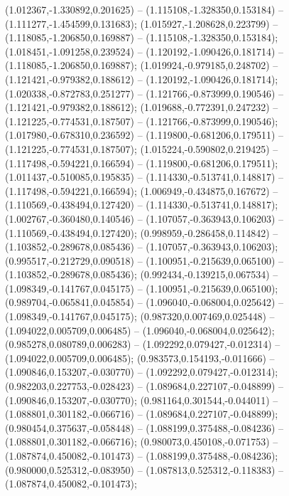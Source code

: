  (1.012367,-1.330892,0.201625) -- (1.115108,-1.328350,0.153184) -- (1.111277,-1.454599,0.131683);
 (1.015927,-1.208628,0.223799) -- (1.118085,-1.206850,0.169887) -- (1.115108,-1.328350,0.153184);
 (1.018451,-1.091258,0.239524) -- (1.120192,-1.090426,0.181714) -- (1.118085,-1.206850,0.169887);
 (1.019924,-0.979185,0.248702) -- (1.121421,-0.979382,0.188612) -- (1.120192,-1.090426,0.181714);
 (1.020338,-0.872783,0.251277) -- (1.121766,-0.873999,0.190546) -- (1.121421,-0.979382,0.188612);
 (1.019688,-0.772391,0.247232) -- (1.121225,-0.774531,0.187507) -- (1.121766,-0.873999,0.190546);
 (1.017980,-0.678310,0.236592) -- (1.119800,-0.681206,0.179511) -- (1.121225,-0.774531,0.187507);
 (1.015224,-0.590802,0.219425) -- (1.117498,-0.594221,0.166594) -- (1.119800,-0.681206,0.179511);
 (1.011437,-0.510085,0.195835) -- (1.114330,-0.513741,0.148817) -- (1.117498,-0.594221,0.166594);
 (1.006949,-0.434875,0.167672) -- (1.110569,-0.438494,0.127420) -- (1.114330,-0.513741,0.148817);
 (1.002767,-0.360480,0.140546) -- (1.107057,-0.363943,0.106203) -- (1.110569,-0.438494,0.127420);
 (0.998959,-0.286458,0.114842) -- (1.103852,-0.289678,0.085436) -- (1.107057,-0.363943,0.106203);
 (0.995517,-0.212729,0.090518) -- (1.100951,-0.215639,0.065100) -- (1.103852,-0.289678,0.085436);
 (0.992434,-0.139215,0.067534) -- (1.098349,-0.141767,0.045175) -- (1.100951,-0.215639,0.065100);
 (0.989704,-0.065841,0.045854) -- (1.096040,-0.068004,0.025642) -- (1.098349,-0.141767,0.045175);
 (0.987320,0.007469,0.025448) -- (1.094022,0.005709,0.006485) -- (1.096040,-0.068004,0.025642);
 (0.985278,0.080789,0.006283) -- (1.092292,0.079427,-0.012314) -- (1.094022,0.005709,0.006485);
 (0.983573,0.154193,-0.011666) -- (1.090846,0.153207,-0.030770) -- (1.092292,0.079427,-0.012314);
 (0.982203,0.227753,-0.028423) -- (1.089684,0.227107,-0.048899) -- (1.090846,0.153207,-0.030770);
 (0.981164,0.301544,-0.044011) -- (1.088801,0.301182,-0.066716) -- (1.089684,0.227107,-0.048899);
 (0.980454,0.375637,-0.058448) -- (1.088199,0.375488,-0.084236) -- (1.088801,0.301182,-0.066716);
 (0.980073,0.450108,-0.071753) -- (1.087874,0.450082,-0.101473) -- (1.088199,0.375488,-0.084236);
 (0.980000,0.525312,-0.083950) -- (1.087813,0.525312,-0.118383) -- (1.087874,0.450082,-0.101473);
